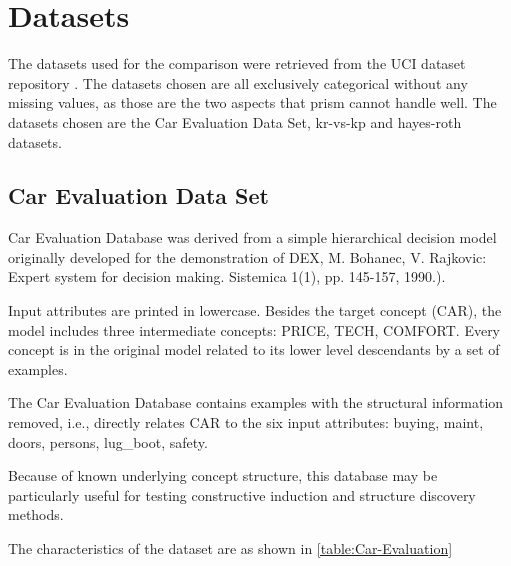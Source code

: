 \section{Datasets}

The datasets used for the comparison were retrieved from the UCI dataset repository \cite{UCI}. The datasets chosen are all exclusively categorical without any missing values, as those are the two aspects that prism cannot handle well. The datasets chosen are the Car Evaluation Data Set, kr-vs-kp and hayes-roth datasets.

\subsection{Car Evaluation Data Set}

Car Evaluation Database\cite{CarDatasetUCI} was derived from a simple hierarchical decision model originally developed for the demonstration of DEX, M. Bohanec, V. Rajkovic: Expert system for decision making. Sistemica 1(1), pp. 145-157, 1990.).\;

Input attributes are printed in lowercase. Besides the target concept (CAR), the model includes three intermediate concepts: PRICE, TECH, COMFORT. Every concept is in the original model related to its lower level descendants by a set of examples.\;

The Car Evaluation Database contains examples with the structural information removed, i.e., directly relates CAR to the six input attributes: buying, maint, doors, persons, lug\_boot, safety.\;

Because of known underlying concept structure, this database may be particularly useful for testing constructive induction and structure discovery methods.\;

The characteristics of the dataset are as shown in \ref{table:Car-Evaluation}\;
\begin{table}[ht]
\caption{\label{table:Car-Evaluation}Car Evaluation Characteristics}
\end{table}

